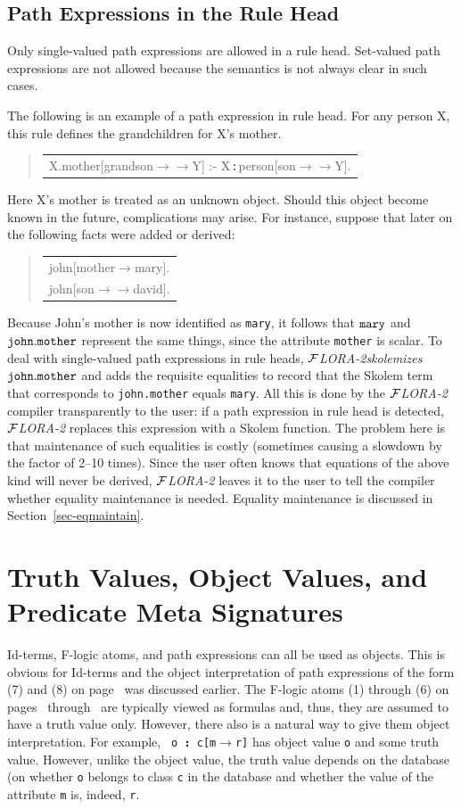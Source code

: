 \documentclass[11pt]{article}
\newenvironment{qrules}{\begin{quote}\tt\begin{tabular}[t]{l}}%
{\end{tabular}\end{quote}}
\newcommand{\isa}{\,{\bf{:}}\,}
\newcommand{\fd}{\ensuremath{{\rightarrow}}}                   %
\newcommand{\mvd}{\ensuremath{{\rightarrow\!\!\!\!\rightarrow}}}  %
\newcommand{\FLORA}{{\mbox{${\cal F}${\small\it LORA}\rm\emph{-2}}}\xspace}
\newcommand{\fl}{\mbox{F-logic}\xspace}
\begin{document}
\subsection{Path Expressions in the Rule Head}\label{sec-pathexp-head}


Only single-valued path expressions are allowed in a rule head. Set-valued
path expressions are not allowed because the semantics is not always clear
in such cases.

The following is an example of a path expression in rule head. For any
person X, this rule defines the grandchildren for X's mother.
\begin{qrules}
X.mother[grandson{\mvd}Y] :- X{\isa}person[son{\mvd}Y].
\end{qrules}
Here X's mother is treated as an unknown object. Should this object become
known in the future, complications may arise. For instance, suppose that
later on the following facts were added or derived:
\begin{qrules}
  john[mother{\fd}mary]. \\
  john[son{\mvd}david].
\end{qrules}

Because John's mother is now identified as {\tt mary}, it follows that
${\tt mary}$ and ${\tt john.mother}$ represent the same things, since the
attribute {\tt mother} is scalar. To deal with single-valued path
expressions in rule heads, \FLORA \emph{skolemizes} ${\tt john.mother}$ and
adds the requisite equalities to record that the Skolem term that
corresponds to {\tt john.mother} equals {\tt mary}.  All this is done by
the \FLORA compiler transparently to the user: if a path expression in rule
head is detected, \FLORA replaces this expression with a Skolem function.
The problem here is that maintenance of such equalities is costly
(sometimes causing a slowdown by the factor of 2--10 times). Since the user
often knows that equations of the above kind will never be derived, \FLORA
leaves it to the user to tell the compiler whether equality maintenance is
needed.  Equality maintenance is discussed in Section~\ref{sec-eqmaintain}.


\section{Truth Values, Object Values, and Predicate Meta Signatures}
\label{sec-references}


Id-terms, \fl atoms, and path expressions can all be used as objects. This
is obvious for Id-terms and the object interpretation of path expressions
of the form (7) and (8) on page~\pageref{eq-path-fun} was discussed
earlier. The \fl atoms (1) through (6) on pages~\pageref{eq-scalar-atom}
through~\pageref{eq-subclass} are typically viewed as formulas and, thus,
they are assumed to have a truth value only.  However, there also is a
natural way to give them object interpretation.  For example, {\tt
  o{\isa}c[m{\fd}r]} has object value {\tt o} and some truth value.
However, unlike the object value, the truth value depends on the database
(on whether {\tt o} belongs to class {\tt c} in the database and whether
the value of the attribute {\tt m} is, indeed, {\tt r}.
\end{document}
